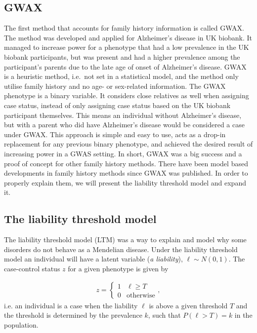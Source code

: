 \subsection{GWAX}
The first method that accounts for family history information is called GWAX. The method was developed and applied for Alzheimer's disease in UK biobank\cite{gwax}. It managed to increase power for a phenotype that had a low prevalence in the UK biobank participants, but was present and had a higher prevalence among the participant's parents due to the late age of onset of Alzheimer's disease. GWAX is a heuristic method, i.e.\ not set in a statistical model, and the method only utilise family history and no age- or sex-related information. The GWAX phenotype is a binary variable. It considers close relatives as well when assigning case status, instead of only assigning case status based on the UK biobank participant themselves. This means an individual without Alzheimer's disease, but with a parent who did have Alzheimer's disease would be considered a case under GWAX. This approach is simple and easy to use, acts as a drop-in replacement for any previous binary phenotype, and achieved the desired result of increasing power in a GWAS setting. In short, GWAX was a big success and a proof of concept for other family history methods. There have been model based developments in family history methods since GWAX was published. In order to properly explain them, we will present the liability threshold model and expand it.


\subsection{The liability threshold model}
The liability threshold model (LTM) was a way to explain and model why some disorders do not behave as a Mendelian disease. Under the liability threshold model an individual will have a latent variable (\textit{a liability}), $ \ell \sim N(0,1)$. The case-control status $ z $ for a given phenotype is given by 

\begin{align*}
z = 
\begin{cases}
1 & \ell \geq T \\
0 & \text{otherwise}
\end{cases},
\end{align*}
i.e. an individual is a case when the liability $ \ell $ is above a given threshold $ T $ and the threshold is determined by the prevalence $ k $, such that $ P(\ell > T) = k $ in the population. 

